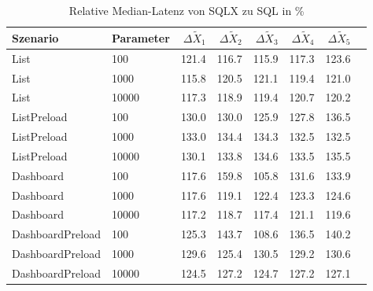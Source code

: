 
\begin{table}[ht]
\setlength{\extrarowheight}{-1pt}
\centering
\caption{Relative Median-Latenz von SQLX zu SQL in \%}
\begin{tabular}{llrrrrrr}
\toprule
Szenario & Parameter & ${\Delta \tilde{X}_1}$ & ${\Delta \tilde{X}_2}$ & ${\Delta \tilde{X}_3}$ & ${\Delta \tilde{X}_4}$ & ${\Delta \tilde{X}_5}$ \\
\midrule
	List & 100 & \cellcolor{red!19}  121.4 & \cellcolor{red!17}  116.7 & \cellcolor{red!16}  115.9 & \cellcolor{red!17}  117.3 & \cellcolor{red!19}  123.6 \\
	List & 1000 & \cellcolor{red!16}  115.8 & \cellcolor{red!18}  120.5 & \cellcolor{red!18}  121.1 & \cellcolor{red!18}  119.4 & \cellcolor{red!18}  121.0 \\
	List & 10000 & \cellcolor{red!17}  117.3 & \cellcolor{red!18}  118.9 & \cellcolor{red!18}  119.4 & \cellcolor{red!18}  120.7 & \cellcolor{red!18}  120.2 \\
	ListPreload & 100 & \cellcolor{red!22}  130.0 & \cellcolor{red!22}  130.0 & \cellcolor{red!20}  125.9 & \cellcolor{red!21}  127.8 & \cellcolor{red!25}  136.5 \\
	ListPreload & 1000 & \cellcolor{red!23}  133.0 & \cellcolor{red!24}  134.4 & \cellcolor{red!24}  134.3 & \cellcolor{red!23}  132.5 & \cellcolor{red!23}  132.5 \\
	ListPreload & 10000 & \cellcolor{red!22}  130.1 & \cellcolor{red!24}  133.8 & \cellcolor{red!24}  134.6 & \cellcolor{red!23}  133.5 & \cellcolor{red!24}  135.5 \\
	Dashboard & 100 & \cellcolor{red!17}  117.6 & \cellcolor{red!30}  159.8 & \cellcolor{red!12}  105.8 & \cellcolor{red!23}  131.6 & \cellcolor{red!24}  133.9 \\
	Dashboard & 1000 & \cellcolor{red!17}  117.6 & \cellcolor{red!18}  119.1 & \cellcolor{red!19}  122.4 & \cellcolor{red!19}  123.3 & \cellcolor{red!20}  124.6 \\
	Dashboard & 10000 & \cellcolor{red!17}  117.2 & \cellcolor{red!17}  118.7 & \cellcolor{red!17}  117.4 & \cellcolor{red!18}  121.1 & \cellcolor{red!18}  119.6 \\
	DashboardPreload & 100 & \cellcolor{red!20}  125.3 & \cellcolor{red!27}  143.7 & \cellcolor{red!13}  108.6 & \cellcolor{red!25}  136.5 & \cellcolor{red!26}  140.2 \\
	DashboardPreload & 1000 & \cellcolor{red!22}  129.6 & \cellcolor{red!20}  125.4 & \cellcolor{red!22}  130.5 & \cellcolor{red!22}  129.2 & \cellcolor{red!22}  130.6 \\
	DashboardPreload & 10000 & \cellcolor{red!20}  124.5 & \cellcolor{red!21}  127.2 & \cellcolor{red!20}  124.7 & \cellcolor{red!21}  127.2 & \cellcolor{red!21}  127.1 \\
\bottomrule
\end{tabular}
\label{tab:relativer_durchsatz_sqlx}
\end{table}
	